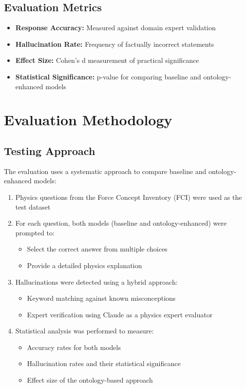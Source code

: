 \subsection{Evaluation Metrics}
\begin{itemize}
    \item \textbf{Response Accuracy:} Measured against domain expert validation
    \item \textbf{Hallucination Rate:} Frequency of factually incorrect statements
    \item \textbf{Effect Size:} Cohen's d measurement of practical significance
    \item \textbf{Statistical Significance:} p-value for comparing baseline and ontology-enhanced models
\end{itemize}

\section{Evaluation Methodology}
\label{sec:evaluation-methodology}

\subsection{Testing Approach}
The evaluation uses a systematic approach to compare baseline and ontology-enhanced models:

\begin{enumerate}
    \item Physics questions from the Force Concept Inventory (FCI) were used as the test dataset
    \item For each question, both models (baseline and ontology-enhanced) were prompted to:
        \begin{itemize}
            \item Select the correct answer from multiple choices
            \item Provide a detailed physics explanation
        \end{itemize}
    \item Hallucinations were detected using a hybrid approach:
        \begin{itemize}
            \item Keyword matching against known misconceptions
            \item Expert verification using Claude as a physics expert evaluator
        \end{itemize}
    \item Statistical analysis was performed to measure:
        \begin{itemize}
            \item Accuracy rates for both models
            \item Hallucination rates and their statistical significance
            \item Effect size of the ontology-based approach
        \end{itemize}
\end{enumerate}

